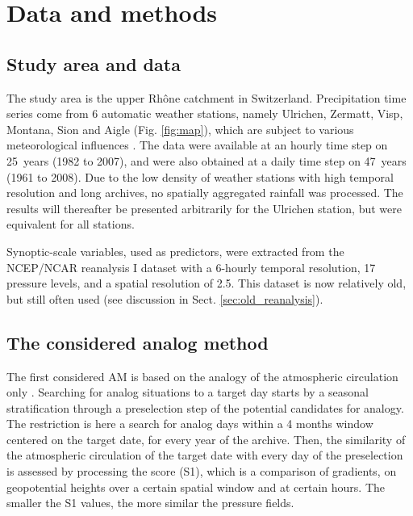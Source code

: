 \documentclass[hess, manuscript]{copernicus}
\begin{document}
\section{Data and methods}
\label{sec:data_methods}

\subsection{Study area and data}
\label{sec:data}

The study area is the upper Rh\^{o}ne catchment in Switzerland. Precipitation time series come from 6 automatic weather stations, namely Ulrichen, Zermatt, Visp, Montana, Sion and Aigle (Fig. \ref{fig:map}), which are subject to various meteorological influences \citep{Horton2012}. The data were available at an hourly time step on 25~years (1982 to 2007), and were also obtained at a daily time step on 47~years (1961 to 2008). Due to the low density of weather stations with high temporal resolution and long archives, no spatially aggregated rainfall was processed. The results will thereafter be presented arbitrarily for the Ulrichen station, but were equivalent for all stations.

Synoptic-scale variables, used as predictors, were extracted from the NCEP/NCAR reanalysis I \citep{Kalnay1996} dataset with a 6-hourly temporal resolution, 17 pressure levels, and a spatial resolution of 2.5\degree. This dataset is now relatively old, but still often used (see discussion in Sect. \ref{sec:old_reanalysis}).


\subsection{The considered analog method}
\label{sec:analog_method}

The first considered AM is based on the analogy of the atmospheric circulation only \citep[Table \ref{table:method_2Z},][]{Obled2002, Bontron2005, Marty2012}. Searching for analog situations to a target day starts by a seasonal stratification through a preselection step of the potential candidates for analogy. The restriction is here a search for analog days within a 4 months window centered on the target date, for every year of the archive. Then, the similarity of the atmospheric circulation of the target date with every day of the preselection is assessed by processing the \citet{Teweles1954} score (S1), which is a comparison of gradients, on geopotential heights over a certain spatial window and at certain hours. The smaller the S1 values, the more similar the pressure fields.
\end{document}
